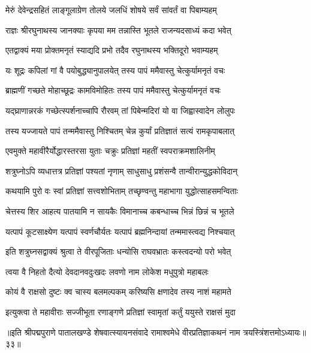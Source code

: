 \twolineshloka
{मेरुं देवेन्द्रसहितं लाङ्गूलाग्रेण तोलये}
{जलधिं शोषये सर्वं सांवर्तं वा पिबाम्यहम्}%

\twolineshloka
{राज्ञः श्रीरघुनाथस्य जानक्याः कृपया मम}
{तन्नास्ति भूतले राजन्यदसाध्यं कदा भवेत्}%

\twolineshloka
{एतद्वाक्यं मया प्रोक्तमनृतं स्याद्यदि प्रभो}
{तदैव रघुनाथस्य भक्तिदूरो भवाम्यहम्}%

\twolineshloka
{यः शूद्रः कपिलां गां वै पयोबुद्ध्यानुपालयेत्}
{तस्य पापं ममैवास्तु चेत्कुर्यामनृतं वचः}%

\twolineshloka
{ब्राह्मणीं गच्छते मोहाच्छूद्रः कामविमोहितः}
{तस्य पापं ममैवास्तु चेत्कुर्यामनृतं वचः}%

\twolineshloka
{यद्घ्राणान्नरकं गच्छेत्स्पर्शनाच्चापि रौरवम्}
{तां पिबेन्मदिरां यो वा जिह्वास्वादेन लोलुपः}%

\twolineshloka
{तस्य यज्जायते पापं तन्ममैवास्तु निश्चितम्}
{चेन्न कुर्यां प्रतिज्ञातं सत्यं रामकृपाबलात्}%

\twolineshloka
{एवमुक्ते महावीरैर्योद्धारस्तरसा युताः}
{चक्रुः प्रतिज्ञां महतीं स्वपराक्रमशालिनीम्}%

\twolineshloka
{शत्रुघ्नोऽपि व्यधात्तत्र प्रतिज्ञां पश्यतां नृणाम्}
{साधुसाधु प्रशंसन्वै तान्वीरान्युद्धकोविदान्}%

\twolineshloka
{कथयामि पुरो वः स्वां प्रतिज्ञां सत्त्वशोभिताम्}
{तच्छृण्वन्तु महाभागा युद्धोत्साहसमन्विताः}%

\twolineshloka
{चेत्तस्य शिर आहत्य पातयामि न सायकैः}
{विमानाच्च कबन्धाच्च भिन्नं छिन्नं च भूतले}%

\twolineshloka
{यत्पापं कूटसाक्ष्येण यत्पापं स्वर्णचौर्यतः}
{यत्पापं ब्रह्मनिन्दायां तन्ममास्त्वद्य निश्चयात्}%

\twolineshloka
{इति शत्रुघ्नसद्वाक्यं श्रुत्वा ते वीरपूजिताः}
{धन्योसि राघवभ्रातः कस्त्वदन्यो परो भवेत्}%

\twolineshloka
{त्वया वै निहतो दैत्यो देवदानवदुःखदः}
{लवणो नाम लोकेश मधुपुत्रो महाबलः}%

\twolineshloka
{कोयं वै राक्षसो दुष्टः क्व चास्य बलमल्पकम्}
{करिष्यसि क्षणादेव तस्य नाशं महामते}%

\twolineshloka
{इत्युक्त्वा ते महावीराः सज्जीभूता रणाङ्गणे}
{प्रतिज्ञां स्वामृतां कर्तुं ययुस्ते राक्षसं मुदा}%

॥इति श्रीपद्मपुराणे पातालखण्डे शेषवात्स्यायनसंवादे रामाश्वमेधे वीरप्रतिज्ञाकथनं नाम त्रयस्त्रिंशत्तमोऽध्यायः॥३३॥



